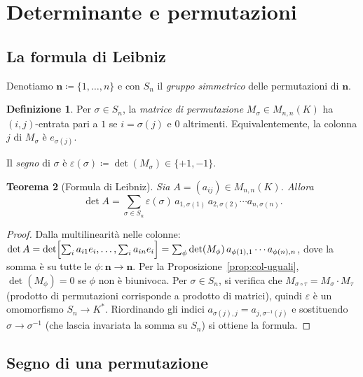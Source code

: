 \documentclass[11pt, a4paper]{book}
\theoremstyle{definition}
\newtheorem{definizione}{Definizione}[section]
\theoremstyle{plain}
\newtheorem{teorema}[definizione]{Teorema}
\theoremstyle{remark}
\begin{document}
\section{Determinante e permutazioni}
\label{sec:det-permutazioni}

\subsection{La formula di Leibniz}

Denotiamo $\mathbf{n} \coloneqq \{1,\ldots,n\}$ e con $S_n$ il \emph{gruppo simmetrico} delle permutazioni di $\mathbf{n}$.

\begin{defbox}
\begin{definizione}
Per $\sigma \in S_n$, la \emph{matrice di permutazione} $M_\sigma \in M_{n,n}(K)$ ha $(i,j)$-entrata pari a $1$ se $i=\sigma(j)$ e $0$ altrimenti. Equivalentemente, la colonna $j$ di $M_\sigma$ è $e_{\sigma(j)}$.

Il \emph{segno} di $\sigma$ è $\varepsilon(\sigma) \coloneqq \det(M_\sigma) \in \{+1,-1\}$.
\end{definizione}
\end{defbox}

\begin{teorema}[Formula di Leibniz]
\label{thm:leibniz}
Sia $A = (a_{ij}) \in M_{n,n}(K)$. Allora
\[
  \det A = \sum_{\sigma \in S_n} \varepsilon(\sigma)\,a_{1,\sigma(1)}\,a_{2,\sigma(2)}\cdots a_{n,\sigma(n)}.
\]
\end{teorema}

\begin{proof}
Dalla multilinearità nelle colonne: $\det A = \det\Bigl[\sum_i a_{i1}e_i,\ldots,\sum_i a_{in}e_i\Bigr] = \sum_\phi \det(M_\phi)\,a_{\phi(1),1}\cdots a_{\phi(n),n}$, dove la somma è su tutte le $\phi \colon \mathbf{n}\to\mathbf{n}$. Per la Proposizione~\ref{prop:col-uguali}, $\det(M_\phi)=0$ se $\phi$ non è biunivoca. Per $\sigma \in S_n$, si verifica che $M_{\sigma\circ\tau} = M_\sigma \cdot M_\tau$ (prodotto di permutazioni corrisponde a prodotto di matrici), quindi $\varepsilon$ è un omomorfismo $S_n \to K^*$. Riordinando gli indici $a_{\sigma(j),j} = a_{j,\sigma^{-1}(j)}$ e sostituendo $\sigma \to \sigma^{-1}$ (che lascia invariata la somma su $S_n$) si ottiene la formula.
\end{proof}

\subsection{Segno di una permutazione}
\end{document}
